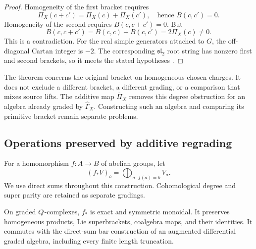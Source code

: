 \begin{proof}
Homogeneity of the first bracket requires
\[
\Pi_X(c+c')=\Pi_X(c)+\Pi_X(c'),
\quad\text{hence }B(c,c')=0.
\]
Homogeneity of the second requires $B(c,c+c')=0$.  But
\[
B(c,c+c')=B(c,c)+B(c,c')=2\Pi_X(c)\ne0.
\]
This is a contradiction.  For the real simple generators attached to
$G$, the off-diagonal Cartan integer is $-2$.  The corresponding
$\mathfrak{sl}_2$ root string has nonzero first and second brackets,
so it meets the stated hypotheses \cite{GN}.
\end{proof}

\begin{remark}
\label{rem:no-go-scope}
The theorem concerns the original bracket on homogeneous chosen
charges.  It does not exclude a different bracket, a different
grading, or a comparison that mixes source lifts.  The additive map
$\overline\Pi_X$ removes this degree obstruction for an algebra
already graded by $\widehat\Gamma_X$.  Constructing such an algebra
and comparing its primitive bracket remain separate problems.
\end{remark}

\subsection{Operations preserved by additive regrading}
\label{k3:subsec:additive-regrading}

For a homomorphism $f:A\to B$ of abelian groups, let
\[
(f_*V)_b=\bigoplus_{a:\,f(a)=b}V_a.
\]
We use direct sums throughout this construction.  Cohomological
degree and super parity are retained as separate gradings.

\begin{proposition}
\label{k3:prop:regrading}
On graded $Q$-complexes, $f_*$ is exact and symmetric monoidal.
It preserves homogeneous products, Lie superbrackets, coalgebra
maps, and their identities.  It commutes with the direct-sum bar construction of an augmented
differential graded algebra, including every finite length truncation.
\end{proposition}

